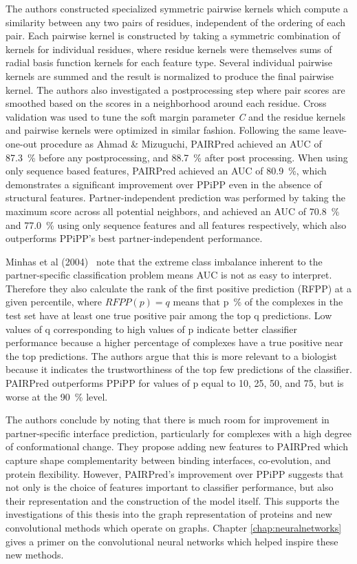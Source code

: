 The authors constructed specialized symmetric pairwise kernels which compute a similarity between any two pairs of residues, independent of the ordering of each pair.
Each pairwise kernel is constructed by taking a symmetric combination of kernels for individual residues, where residue kernels were themselves sums of radial basis function kernels for each feature type.
Several individual pairwise kernels are summed and the result is normalized to produce the final pairwise kernel.
The authors also investigated a postprocessing step where pair scores are smoothed based on the scores in a neighborhood around each residue.
Cross validation was used to tune the soft margin parameter \textit{C} and the residue kernels and pairwise kernels were optimized in similar fashion. 
Following the same leave-one-out procedure as Ahmad \& Mizuguchi, PAIRPred achieved an AUC of 87.3~\% before any postprocessing, and 88.7~\% after post processing.
When using only sequence based features, PAIRPred achieved an AUC of 80.9~\%, which demonstrates a significant improvement over PPiPP even in the absence of structural features.
Partner-independent prediction was performed by taking the maximum score across all potential neighbors, and achieved an AUC of 70.8~\% and 77.0~\% using only sequence features and all features respectively, which also outperforms PPiPP's best partner-independent performance.

Minhas et al (2004)~\cite{minhas2014} note that the extreme class imbalance inherent to the partner-specific classification problem means AUC is not as easy to interpret. 
Therefore they also calculate the rank of the first positive prediction (RFPP) at a given percentile, where $RFPP(p) = q$ means that p~\% of the complexes in the test set have at least one true positive pair among the top q predictions.
Low values of q corresponding to high values of p indicate better classifier performance because a higher percentage of complexes have a true positive near the top predictions.
The authors argue that this is more relevant to a biologist because it indicates the trustworthiness of the top few predictions of the classifier. 
PAIRPred outperforms PPiPP for values of p equal to 10, 25, 50, and 75, but is worse at the 90~\% level.

The authors conclude by noting that there is much room for improvement in partner-specific interface prediction, particularly for complexes with a high degree of conformational change. 
They propose adding new features to PAIRPred which capture shape complementarity between binding interfaces, co-evolution, and protein flexibility.
However, PAIRPred's improvement over PPiPP suggests that not only is the choice of features important to classifier performance, but also their representation and the construction of the model itself.
This supports the investigations of this thesis into the graph representation of proteins and new convolutional methods which operate on graphs.
Chapter \ref{chap:neuralnetworks} gives a primer on the convolutional neural networks which helped inspire these new methods.